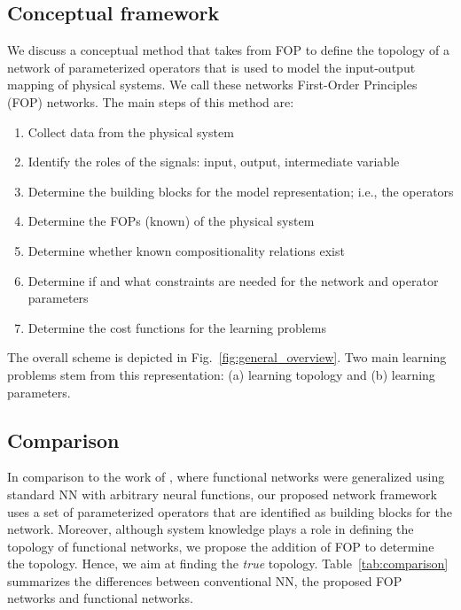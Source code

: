 \subsection{Conceptual framework}
We discuss a conceptual method that takes from FOP to define the topology of a network of parameterized operators that is used to model the input-output mapping of physical systems. We call these networks First-Order Principles (FOP) networks. The main steps of this method are:
\begin{enumerate}
\item Collect data from the physical system
\item Identify the roles of the signals: input, output, intermediate variable
\item Determine the building blocks for the model representation; i.e., the operators
\item Determine the FOPs (known) of the physical system
\item Determine whether known compositionality relations exist
\item Determine if and what constraints are needed for the network and operator parameters
\item Determine the cost functions for the learning problems
\end{enumerate}
The overall scheme is depicted in Fig.~\ref{fig:general_overview}. Two main learning problems stem from this representation: (a) learning topology and (b) learning parameters. 

\subsection{Comparison}
In comparison to the work of \cite{CastilloSanAloCas2007}, where functional networks were generalized using standard NN with arbitrary neural functions, our proposed network framework uses a set of parameterized operators that are identified as building blocks for the network. Moreover, although system knowledge plays a role in defining the topology of functional networks, we propose the addition of FOP to determine the topology. Hence, we aim at finding the \emph{true} topology. Table~\ref{tab:comparison} summarizes the differences between conventional NN, the proposed FOP networks and functional networks.
